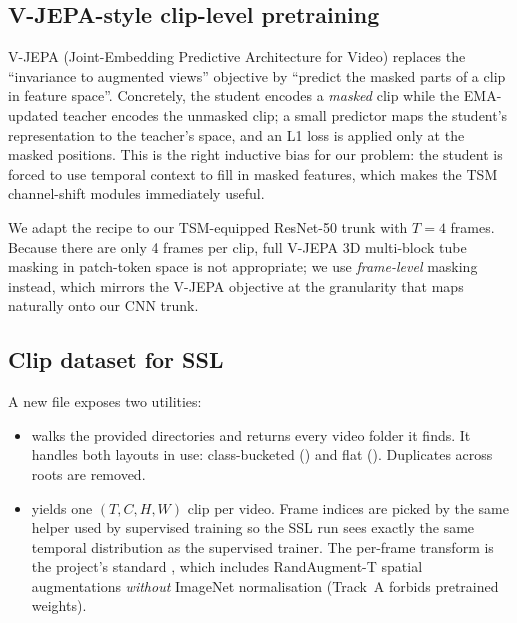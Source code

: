 \subsection{V-JEPA-style clip-level pretraining}
\label{sec:phase3:vjepa-overview}

V-JEPA (Joint-Embedding Predictive Architecture for Video)
\cite{Bardes2024VJEPA, Assran2025VJEPA2} replaces the
``invariance to augmented views'' objective by ``predict the masked
parts of a clip in feature space''. Concretely, the student encodes a
\emph{masked} clip while the EMA-updated teacher encodes the unmasked
clip; a small predictor maps the student's representation to the
teacher's space, and an L1 loss is applied only at the masked positions.
This is the right inductive bias for our problem: the student is
forced to use temporal context to fill in masked features, which makes
the TSM channel-shift modules immediately useful.

We adapt the recipe to our TSM-equipped ResNet-50 trunk with $T=4$
frames. Because there are only 4 frames per clip, full V-JEPA 3D
multi-block tube masking in patch-token space is not appropriate; we
use \emph{frame-level} masking instead, which mirrors the V-JEPA
objective at the granularity that maps naturally onto our CNN trunk.

\subsection{Clip dataset for SSL}
\label{sec:phase3:dataset}

A new file 
exposes two utilities:

\begin{itemize}[leftmargin=2em]
\item {} walks the provided
      directories and returns every video folder it finds. It handles
      both layouts in use: class-bucketed
      () and flat
      (). Duplicates across roots are
      removed.
\item {} yields one \((T, C, H, W)\) clip per video.
      Frame indices are picked by the same 
      helper used by supervised training so the SSL run sees exactly
      the same temporal distribution as the supervised trainer. The
      per-frame transform is the project's standard
      , which includes
      RandAugment-T spatial augmentations \emph{without} ImageNet
      normalisation (Track~A forbids pretrained weights).
\end{itemize}

